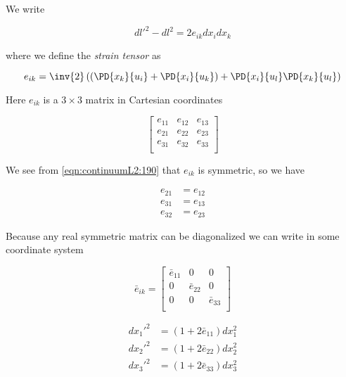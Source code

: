 We write

\begin{equation}\label{eqn:continuumL2:170}
{dl'}^2 - dl^2 = 2 e_{ik} dx_i dx_k
\end{equation}

where we define the \emph{strain tensor} as

\begin{equation}\label{eqn:continuumL2:190}
e_{ik} = \inv{2} \left(
\left(
\PD{x_k}{u_i} 
+
\PD{x_i}{u_k} 
\right)
+ \PD{x_i}{u_l} 
\PD{x_k}{u_l} 
\right)
\end{equation}

Here $e_{ik}$ is a $3 \times 3$ matrix in Cartesian coordinates

\begin{equation}\label{eqn:continuumL2:210}
\begin{bmatrix}
e_{11} & e_{12} & e_{13} \\
e_{21} & e_{22} & e_{23} \\
e_{31} & e_{32} & e_{33} \\
\end{bmatrix}
\end{equation}

We see from \ref{eqn:continuumL2:190} that $e_{ik}$ is symmetric, so we have

\begin{align}\label{eqn:continuumL2:n}
e_{21} &= e_{12} \\
e_{31} &= e_{13} \\
e_{32} &= e_{23}
\end{align}

Because any real symmetric matrix can be diagonalized we can write in some coordinate system

\begin{equation}\label{eqn:continuumL2:n}
\bar{e}_{ik} = 
\begin{bmatrix}
\bar{e}_{11} & 0 & 0 \\
0 & \bar{e}_{22} & 0 \\
0 & 0 & \bar{e}_{33} \\
\end{bmatrix}
\end{equation}

\begin{align}\label{eqn:continuumL2:n}
{dx_1'}^2 &= (1 + 2 \bar{e}_{11}) dx_1^2 \\
{dx_2'}^2 &= (1 + 2 \bar{e}_{22}) dx_2^2 \\
{dx_3'}^2 &= (1 + 2 \bar{e}_{33}) dx_3^2
\end{align}

